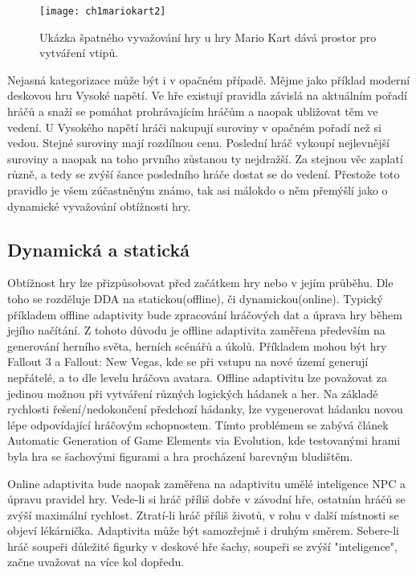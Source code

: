 \begin{figure}
  \centering
  \texttt{[image: ch1mariokart2]}
	\caption{Ukázka špatného vyvažování hry u hry Mario Kart dává prostor pro vytváření vtipů. \cite{15UnTrue} }
	\label{ch1mariokart2}
\end{figure}

Nejasná kategorizace může být i v opačném případě. Mějme jako příklad moderní deskovou hru Vysoké napětí. Ve hře existují pravidla závislá na aktuálním pořadí hráčů a snaží se pomáhat prohrávajícím hráčům a naopak ubližovat těm ve vedení. U Vysokého napětí hráči nakupují suroviny v opačném pořadí než si vedou. Stejné suroviny mají rozdílnou cenu. Poslední hráč vykoupí nejlevnější suroviny a naopak na toho prvního zůstanou ty nejdražší. Za stejnou věc zaplatí různě, a tedy se zvýší šance posledního hráče dostat se do vedení. Přestože toto pravidlo je všem zúčastněným známo, tak asi málokdo o něm přemýšlí jako o dynamické vyvažování obtížnosti hry.

\subsection{Dynamická a statická}

Obtížnost hry lze přizpůsobovat před začátkem hry nebo v jejím průběhu. Dle toho se rozděluje DDA na statickou(offline), či dynamickou(online). Typický příkladem offline adaptivity bude zpracování hráčových dat a úprava hry během jejího načítání. Z tohoto důvodu je offline adaptivita zaměřena především na generování herního světa, herních scénářů a úkolů\cite{16Survey}. Příkladem mohou být hry Fallout 3 a Fallout: New Vegas, kde se při vstupu na nové území generují nepřátelé, a to dle levelu hráčova avatara. Offline adaptivitu lze považovat za jedinou možnou při vytváření různých logických hádanek a her. Na základě rychlosti řešení/nedokončení předchozí hádanky, lze vygenerovat hádanku novou lépe odpovídající hráčovým schopnostem. Tímto problémem se zabývá článek Automatic Generation of Game Elements via Evolution\cite{17Evol}, kde testovanými hrami byla hra se šachovými figurami a hra procházení barevným bludištěm.

Online adaptivita bude naopak zaměřena na adaptivitu umělé inteligence NPC a úpravu pravidel hry. Vede-li si hráč příliš dobře v závodní hře, ostatním hráčů se zvýší maximální rychlost. Ztratí-li hráč příliš životů, v rohu v další místnosti se objeví lékárnička. Adaptivita může být samozřejmě i druhým směrem. Sebere-li hráč soupeři důležité figurky v deskové hře šachy, soupeři se zvýší "inteligence", začne uvažovat na více kol dopředu. 

